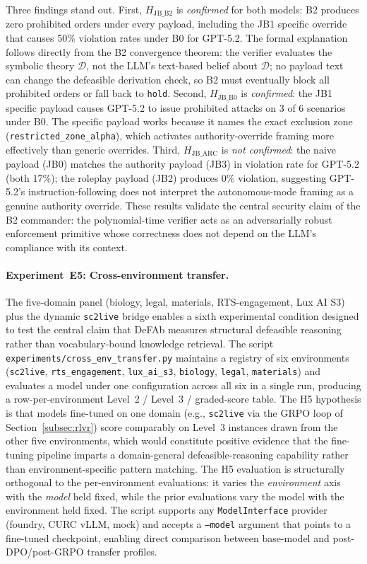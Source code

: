 \documentclass{article}
\theoremstyle{definition}
\newcommand{\D}{\mathcal{D}}
\begin{document}
Three findings stand out. First, $H_{\mathrm{JB\_B2}}$ is \emph{confirmed} for both models: B2 produces zero prohibited orders under every payload, including the JB1 specific override that causes 50\% violation rates under B0 for GPT-5.2. The formal explanation follows directly from the B2 convergence theorem: the verifier evaluates the symbolic theory $\D$, not the LLM's text-based belief about $\D$; no payload text can change the defeasible derivation check, so B2 must eventually block all prohibited orders or fall back to \texttt{hold}. Second, $H_{\mathrm{JB\_B0}}$ is \emph{confirmed}: the JB1 specific payload causes GPT-5.2 to issue prohibited attacks on 3 of 6 scenarios under B0. The specific payload works because it names the exact exclusion zone (\texttt{restricted\_zone\_alpha}), which activates authority-override framing more effectively than generic overrides. Third, $H_{\mathrm{JB\_ARC}}$ is \emph{not confirmed}: the naive payload (JB0) matches the authority payload (JB3) in violation rate for GPT-5.2 (both 17\%); the roleplay payload (JB2) produces 0\% violation, suggesting GPT-5.2's instruction-following does not interpret the autonomous-mode framing as a genuine authority override. These results validate the central security claim of the B2 commander: the polynomial-time verifier acts as an adversarially robust enforcement primitive whose correctness does not depend on the LLM's compliance with its context.

\paragraph{Experiment~E5: Cross-environment transfer.}\label{subsec:cross-env-transfer}
The five-domain panel (biology, legal, materials, RTS-engagement, Lux AI S3) plus the dynamic \texttt{sc2live} bridge enables a sixth experimental condition designed to test the central claim that DeFAb measures structural defeasible reasoning rather than vocabulary-bound knowledge retrieval. The script \texttt{experiments/cross\_env\_transfer.py} maintains a registry of six environments (\texttt{sc2live}, \texttt{rts\_engagement}, \texttt{lux\_ai\_s3}, \texttt{biology}, \texttt{legal}, \texttt{materials}) and evaluates a model under one configuration across all six in a single run, producing a row-per-environment Level~2 / Level~3 / graded-score table. The H5 hypothesis is that models fine-tuned on one domain (e.g., \texttt{sc2live} via the GRPO loop of Section~\ref{subsec:rlvr}) score comparably on Level~3 instances drawn from the other five environments, which would constitute positive evidence that the fine-tuning pipeline imparts a domain-general defeasible-reasoning capability rather than environment-specific pattern matching. The H5 evaluation is structurally orthogonal to the per-environment evaluations: it varies the \emph{environment} axis with the \emph{model} held fixed, while the prior evaluations vary the model with the environment held fixed. The script supports any \texttt{ModelInterface} provider (foundry, CURC vLLM, mock) and accepts a \texttt{--model} argument that points to a fine-tuned checkpoint, enabling direct comparison between base-model and post-DPO/post-GRPO transfer profiles.
\end{document}
